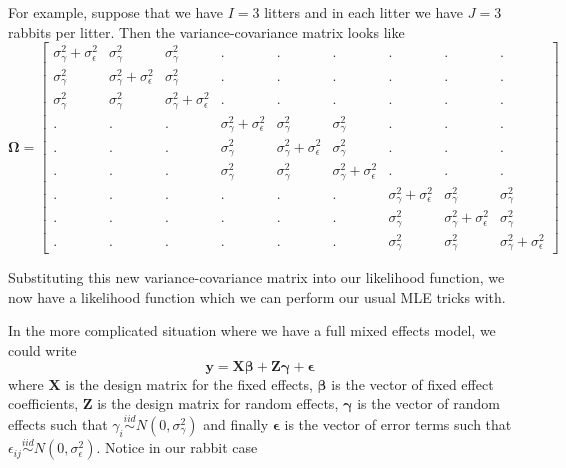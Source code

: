 \documentclass[]{book}
\theoremstyle{definition}
\theoremstyle{definition}
\theoremstyle{remark}
\begin{document}
For example, suppose that we have \(I=3\) litters and in each litter we
have \(J=3\) rabbits per litter. Then the variance-covariance matrix
looks like \[\boldsymbol{\Omega}   =   \left[\begin{array}{ccccccccc}
\sigma_{\gamma}^{2}+\sigma_{\epsilon}^{2} & \sigma_{\gamma}^{2} & \sigma_{\gamma}^{2} & . & . & . & . & . & .\\
\sigma_{\gamma}^{2} & \sigma_{\gamma}^{2}+\sigma_{\epsilon}^{2} & \sigma_{\gamma}^{2} & . & . & . & . & . & .\\
\sigma_{\gamma}^{2} & \sigma_{\gamma}^{2} & \sigma_{\gamma}^{2}+\sigma_{\epsilon}^{2} & . & . & . & . & . & .\\
. & . & . & \sigma_{\gamma}^{2}+\sigma_{\epsilon}^{2} & \sigma_{\gamma}^{2} & \sigma_{\gamma}^{2} & . & . & .\\
. & . & . & \sigma_{\gamma}^{2} & \sigma_{\gamma}^{2}+\sigma_{\epsilon}^{2} & \sigma_{\gamma}^{2} & . & . & .\\
. & . & . & \sigma_{\gamma}^{2} & \sigma_{\gamma}^{2} & \sigma_{\gamma}^{2}+\sigma_{\epsilon}^{2} & . & . & .\\
. & . & . & . & . & . & \sigma_{\gamma}^{2}+\sigma_{\epsilon}^{2} & \sigma_{\gamma}^{2} & \sigma_{\gamma}^{2}\\
. & . & . & . & . & . & \sigma_{\gamma}^{2} & \sigma_{\gamma}^{2}+\sigma_{\epsilon}^{2} & \sigma_{\gamma}^{2}\\
. & . & . & . & . & . & \sigma_{\gamma}^{2} & \sigma_{\gamma}^{2} & \sigma_{\gamma}^{2}+\sigma_{\epsilon}^{2}
\end{array}\right]\]

Substituting this new variance-covariance matrix into our likelihood
function, we now have a likelihood function which we can perform our
usual MLE tricks with.

In the more complicated situation where we have a full mixed effects
model, we could write
\[\boldsymbol{y}=\boldsymbol{X}\boldsymbol{\beta}+\boldsymbol{Z}\boldsymbol{\gamma}+\boldsymbol{\epsilon}\]
where \(\boldsymbol{X}\) is the design matrix for the fixed effects,
\(\boldsymbol{\beta}\) is the vector of fixed effect coefficients,
\(\boldsymbol{Z}\) is the design matrix for random effects,
\(\boldsymbol{\gamma}\) is the vector of random effects such that
\(\gamma_{i}\stackrel{iid}{\sim}N\left(0,\sigma_{\gamma}^{2}\right)\)
and finally \(\boldsymbol{\epsilon}\) is the vector of error terms such
that
\(\epsilon_{ij}\stackrel{iid}{\sim}N\left(0,\sigma_{\epsilon}^{2}\right)\).
Notice in our rabbit case
\end{document}
